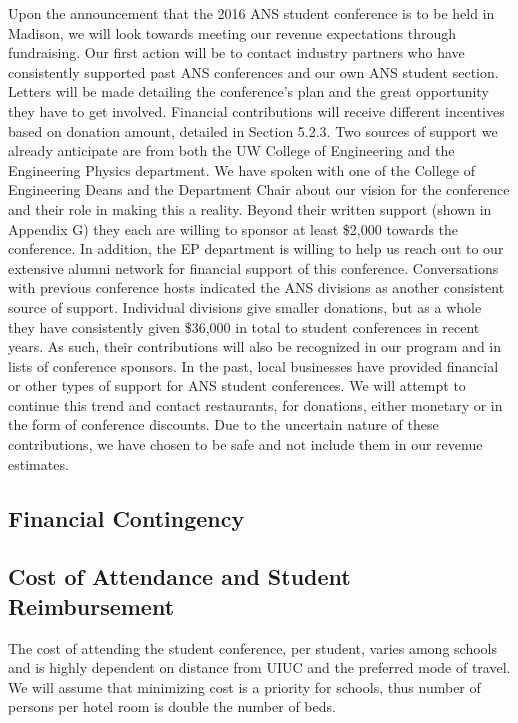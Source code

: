 Upon the announcement that the 2016 ANS student conference is to be held in Madison, we will look towards meeting our revenue expectations through fundraising. Our first action will be to contact industry partners who have consistently supported past ANS conferences and our own ANS student section. Letters will be made detailing the conference’s plan and the great opportunity they have to get involved. Financial contributions will receive different incentives based on donation amount, detailed in Section 5.2.3. Two sources of support we already anticipate are from both the UW College of Engineering and the Engineering Physics department. We have spoken with one of the College of Engineering Deans and the Department Chair about our vision for the conference and their role in making this a reality. Beyond their written support (shown in Appendix G) they each are willing to sponsor at least \$2,000 towards the conference. In addition, the EP department is willing to help us reach out to our extensive alumni network for financial support of this conference. Conversations with previous conference hosts indicated the ANS divisions as another consistent source of support. Individual divisions give smaller donations, but as a whole they have consistently given \$36,000 in total to student conferences in recent years. As such, their contributions will also be recognized in our program and in lists of conference sponsors. In the past, local businesses have provided financial or other types of support for ANS student conferences. We will attempt to continue this trend and contact restaurants, for donations, either monetary or in the form of conference discounts. Due to the uncertain nature of these contributions, we have chosen to be safe and not include them in our revenue estimates.



\subsection{Financial Contingency}

\subsection{Cost of Attendance and Student Reimbursement}
The cost of attending the student conference, per student, varies among schools and is highly dependent on distance from UIUC and the preferred mode of travel. We will assume that minimizing cost is a priority for schools, thus number of persons per hotel room is double the number of beds. 